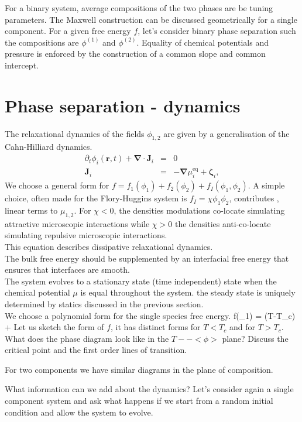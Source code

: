 For a binary system, average compositions of the two phases are be tuning parameters. The Maxwell construction can be discussed geometrically for a single component. For a given free energy $f$, let's consider binary phase separation such the compositions are $\phi^{(1)}$ and $\phi^{(2)}$. Equality of chemical potentials and pressure is enforced by the construction of a common slope and common intercept.
\section{Phase separation - dynamics}
The relaxational dynamics of the fields $\phi_{1,2}$ are given by a generalisation of the Cahn-Hilliard dynamics. 
\begin{eqnarray}
\partial_t \phi_i(\bm{r},t) + \bm{\nabla} \cdot \bm{J}_i &=& 0 \\
 \bm{J}_i &=& - \bm{\nabla} \mu_{i}^\mathrm{eq}   +  \bm{\zeta}_i,
\end{eqnarray}
We choose a general form for $f  = f_1(\phi_1) + f_2(\phi_2) + f_{I}(\phi_1,\phi_2)$. A simple choice, often made for the Flory-Huggins system is $f_I = \chi \phi_1 \phi_2$, contributes , linear terms to $\mu_{1,2}$. For $\chi <0$, the densities modulations co-locate simulating attractive microscopic interactions while $\chi>0$ the densities anti-co-locate simulating repulsive microscopic interactions. 
\\
This equation describes dissipative relaxational dynamics.
\\
The bulk free energy should be supplemented by an interfacial free energy that ensures that interfaces are smooth. 
\\
The system evolves to a stationary state (time independent) state when the chemical potential $\mu$ is equal throughout the system. the steady state is uniquely determined by statics discussed in the previous section. 
\\
We choose a polynomial form for the single species free energy. 
\beq 
f(\phi_1) = (T-T_c)  + 
\eeq
Let us sketch the form of $f$, it has distinct forms for $T<T_c$ and for $T>T_c$. What does the phase diagram look like in the $T -- <\phi>$ plane? Discuss the critical point and the first order lines of transition.

For two components we have similar diagrams in the plane of composition. 


What information can we add about the dynamics? Let's consider again a single component system and ask what happens if we start from a random initial condition and allow the system to evolve.


